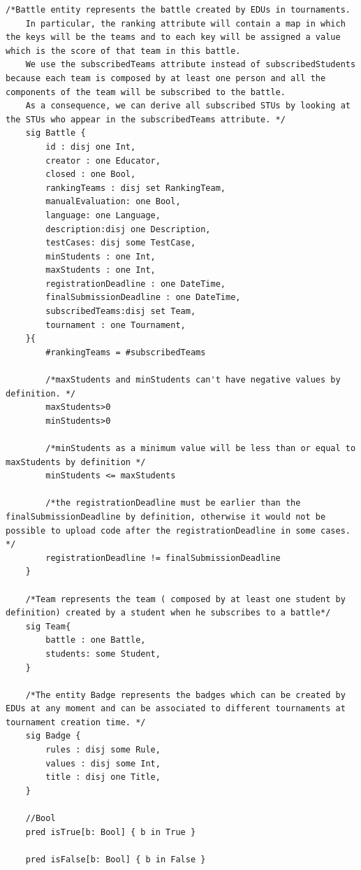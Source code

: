 \begin{lstlisting}[language=Alloy,  label={lst:alloycode}, basicstyle=\fontfamily{Roboto}\selectfont\ttfamily]
    /*Battle entity represents the battle created by EDUs in tournaments.
    In particular, the ranking attribute will contain a map in which the keys will be the teams and to each key will be assigned a value which is the score of that team in this battle.
    We use the subscribedTeams attribute instead of subscribedStudents because each team is composed by at least one person and all the components of the team will be subscribed to the battle. 
    As a consequence, we can derive all subscribed STUs by looking at the STUs who appear in the subscribedTeams attribute. */
    sig Battle {
        id : disj one Int,
        creator : one Educator,
        closed : one Bool,
        rankingTeams : disj set RankingTeam,
        manualEvaluation: one Bool,
        language: one Language,
        description:disj one Description,
        testCases: disj some TestCase,
        minStudents : one Int,
        maxStudents : one Int,
        registrationDeadline : one DateTime,
        finalSubmissionDeadline : one DateTime,
        subscribedTeams:disj set Team,
        tournament : one Tournament,
    }{
        #rankingTeams = #subscribedTeams
        
        /*maxStudents and minStudents can't have negative values by definition. */
        maxStudents>0
        minStudents>0 
        
        /*minStudents as a minimum value will be less than or equal to maxStudents by definition */
        minStudents <= maxStudents
        
        /*the registrationDeadline must be earlier than the finalSubmissionDeadline by definition, otherwise it would not be possible to upload code after the registrationDeadline in some cases. */
        registrationDeadline != finalSubmissionDeadline 
    }
    
    /*Team represents the team ( composed by at least one student by definition) created by a student when he subscribes to a battle*/
    sig Team{
        battle : one Battle,
        students: some Student,
    }
    
    /*The entity Badge represents the badges which can be created by EDUs at any moment and can be associated to different tournaments at tournament creation time. */
    sig Badge {
        rules : disj some Rule,
        values : disj some Int,
        title : disj one Title,
    }
    
    //Bool
    pred isTrue[b: Bool] { b in True }
    
    pred isFalse[b: Bool] { b in False }
        

\end{lstlisting}
